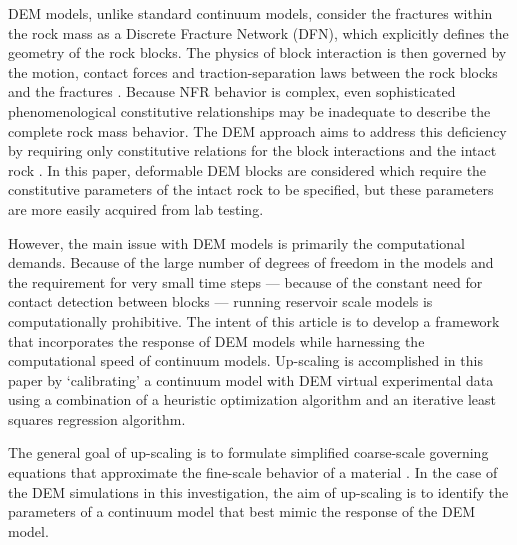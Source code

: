 DEM models, unlike standard continuum models, consider the fractures within the rock mass as a Discrete Fracture Network (DFN), which explicitly defines the geometry of the rock blocks. The physics of block interaction is then governed by the motion, contact forces and traction-separation laws between the rock blocks and the fractures \citep{Thallak_1990}. Because NFR behavior is complex, even sophisticated phenomenological constitutive relationships may be inadequate to describe the complete rock mass behavior. The DEM approach aims to address this deficiency by requiring only constitutive relations for the block interactions and the intact rock \citep{Barbosa_1990}. In this paper,  deformable DEM blocks are considered which require the constitutive parameters of the intact rock to be specified, but these parameters are more easily acquired from lab testing. 

However, the main issue with DEM models is primarily the computational demands. Because of the large number of degrees of freedom in the models and the requirement for very small time steps — because of the constant need for contact detection between blocks — running reservoir scale models is computationally prohibitive. The intent of this article is to develop a framework that incorporates the response of DEM models while harnessing the computational speed of continuum models. Up-scaling is accomplished in this paper by ‘calibrating’ a continuum model with DEM virtual experimental data using a combination of a heuristic optimization algorithm and an iterative least squares regression algorithm.

The general goal of up-scaling is to formulate simplified coarse-scale governing equations that approximate the fine-scale behavior of a material \citep{Geers_2010}. In the case of the DEM simulations in this investigation, the aim of up-scaling is to identify the parameters of a continuum model that best mimic the response of the DEM model.


